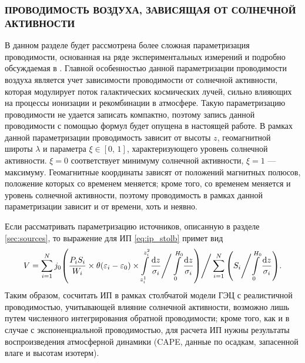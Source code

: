 \subsubsection{ПРОВОДИМОСТЬ ВОЗДУХА, ЗАВИСЯЩАЯ ОТ СОЛНЕЧНОЙ АКТИВНОСТИ}
\label{sec:complicated_sigma}

В данном разделе будет рассмотрена более сложная параметризация проводимости, основанная на ряде экспериментальных измерений и подробно обсуждаемая в \cite{Slyunyaev_et_al_2015}. Главной особенностью данной параметризации проводимости воздуха является учет зависимости проводимости от солнечной активности, которая модулирует поток галактических космических лучей, сильно влияющих на процессы ионизации и рекомбинации в атмосфере. Такую параметризацию проводимости не удается записать компактно, поэтому запись данной проводимости с помощью формул будет опущена в настоящей работе. В рамках данной параметризации проводимость зависит от высоты $z$, геомагнитной широты $\lambda$ и параметра $\xi\in[0,\, 1]$, характеризующего уровень солнечной активности. $\xi=0$ соответствует минимуму солнечной активности, $\xi=1$ --- максимуму. Геомагнитные координаты зависят от положений магнитных полюсов, положение которых со временем меняется; кроме того, со временем меняется и уровень солнечной активности, поэтому проводимость в рамках данной параметризации зависит и от времени, хоть и неявно.

Если рассматривать параметризацию источников, описанную в разделе \ref{sec:sources}, то выражение для ИП \eqref{eq:ip_stolb} примет вид
\begin{equation}
    V = \sum\limits^N_{i=1}j_0\qty(\dfrac{P_i S_i}{W_i} \times \theta(\varepsilon_i - \varepsilon_0) \times \int\limits_{z_i^1}^{z_i^2} \dfrac{
    \dd{z}}{\sigma_i} \Bigg/
    \int\limits_0^{H_0} \dfrac{\dd{z}}{\sigma_i})
    \Bigg/
    \sum\limits^N_{i=1}\qty( S_i \Bigg/ {\int\limits_0^{H_0} \dfrac{\dd{z}}{\sigma_i}}).
    \label{eq:ip_stolb_1}
\end{equation}
Таким образом, сосчитать ИП в рамках столбчатой модели ГЭЦ с реалистичной проводимостью, учитывающей влияние солнечной активности, возможно лишь путем численного интегрирования обратной проводимости; кроме того, как и в случае с экспоненциальной проводимостью, для расчета ИП нужны результаты воспроизведения атмосферной динамики (CAPE, данные по осадкам, запасенной влаге и высотам изотерм).








